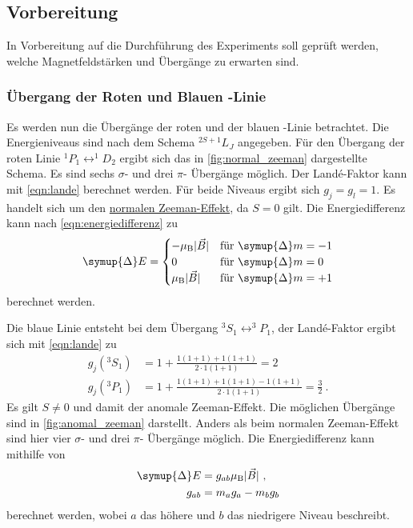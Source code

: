 \subsection{Vorbereitung}

    In Vorbereitung auf die Durchführung des Experiments soll geprüft werden,
    welche Magnetfeldstärken und Übergänge zu erwarten sind.


\subsubsection{Übergang der Roten und Blauen -Linie}
\label{sec:vorb_uebergaenge}

    Es werden nun die Übergänge der roten und der blauen -Linie betrachtet.
    Die Energieniveaus sind nach dem Schema $^{2S+1}L_J$ angegeben.
    Für den Übergang der roten Linie $^1P_1 \leftrightarrow ^1D_2$ ergibt sich
    das in \autoref{fig:normal_zeeman} dargestellte Schema.
    Es sind sechs $\sigma$- und drei $\pi$- Übergänge möglich.
    Der Landé-Faktor kann mit \autoref{eqn:lande} berechnet werden.
    Für beide Niveaus ergibt sich $g_j = g_l = 1$.
    Es handelt sich um den \hyperref[sec:theorie:zeeman:normal]{normalen Zeeman-Effekt},
    da $S = 0$ gilt.
    Die Energiedifferenz kann nach \autoref{eqn:energiedifferenz} zu
    \begin{equation*}
        \symup{\Delta} E =
        \begin{cases}
            - \mu_\text{B} \lvert \vec{B} \rvert & \text{für } \symup{\Delta} m = -1 \\
            0 & \text{für } \symup{\Delta} m = 0 \\
            \mu_\text{B} \lvert \vec{B} \rvert & \text{für } \symup{\Delta} m = +1
        \end{cases}
    \end{equation*}
    berechnet werden.


    Die blaue Linie entsteht bei dem Übergang $^3S_1 \leftrightarrow ^3P_1$,
    der Landé-Faktor ergibt sich mit \autoref{eqn:lande} zu
    \begin{align*}
        g_j(^3S_1) &= 1 + \frac{1(1+1)+1(1+1)}{2 \cdot 1(1+1)} = 2 \\
        g_j(^3P_1) &= 1 + \frac{1(1+1)+1(1+1)-1(1+1)}{2 \cdot 1(1+1)} = \frac{3}{2} \ .
    \end{align*}
    Es gilt $S \neq 0$ und damit der anomale Zeeman-Effekt.
    Die möglichen Übergänge sind in \autoref{fig:anomal_zeeman} darstellt.
    Anders als beim normalen Zeeman-Effekt
    sind hier vier $\sigma$- und drei $\pi$- Übergänge möglich.
    Die Energiedifferenz kann mithilfe von
    \begin{align}
        \symup{\Delta} E &= g_{ab} \mu_\text{B} \lvert \vec{B} \rvert \ ,
        \label{eqn:energiedifferenz_anomal}\\
        g_{ab} &= m_a g_a - m_b g_b
        \label{eqn:lande_anomal}
    \end{align}
    berechnet werden,
    wobei $a$ das höhere und $b$ das niedrigere Niveau beschreibt.

